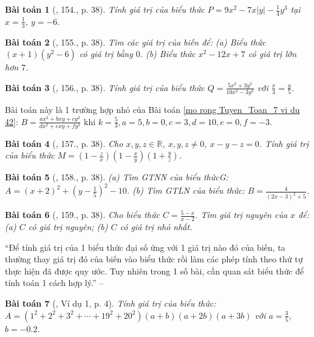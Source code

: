 \documentclass{article}
\newtheorem{baitoan}{Bài toán}
\begin{document}
\begin{baitoan}[\cite{Tuyen_Toan_7}, 154., p. 38]
	Tính giá trị của biểu thức $P = 9x^2 - 7x|y| - \frac{1}{4}y^3$ tại $x = \frac{1}{3}$, $y = -6$.
\end{baitoan}

\begin{baitoan}[\cite{Tuyen_Toan_7}, 155., p. 38]
	Tìm các giá trị của biến để: (a) Biểu thức $(x + 1)(y^2 - 6)$ có giá trị bằng $0$. (b) Biểu thức $x^2 - 12x + 7$ có giá trị lớn hơn $7$.
\end{baitoan}

\begin{baitoan}[\cite{Tuyen_Toan_7}, 156., p. 38]
	Tính giá trị của biểu thức $Q = \frac{5x^2 + 3y^2}{10x^2 - 3y^2}$ với $\frac{x}{3} = \frac{y}{5}$.
\end{baitoan}
Bài toán này là 1 trường hợp nhỏ của Bài toán \ref{mo rong Tuyen_Toan_7 vi du 42}: $B = \frac{ax^2 + bxy + cy^2}{dx^2 + exy + fy^2}$ khi $k = \frac{5}{3}, a = 5, b = 0, c = 3, d = 10, e = 0, f = -3$.

\begin{baitoan}[\cite{Tuyen_Toan_7}, 157., p. 38]
	Cho $x,y,z\in\mathbb{R}$, $x,y,z\ne0$, $x - y - z = 0$. Tính giá trị của biểu thức $M = \left(1 - \frac{z}{x}\right)\left(1 - \frac{x}{y}\right)\left(1 + \frac{y}{z}\right)$.
\end{baitoan}

\begin{baitoan}[\cite{Tuyen_Toan_7}, 158., p. 38]
	(a) Tìm GTNN của biểu thứcG: $A = (x + 2)^2 + \left(y - \frac{1}{5}\right)^2 - 10$. (b) Tìm GTLN của biểu thức: $B = \frac{4}{(2x - 3)^2 + 5}$.
\end{baitoan}

\begin{baitoan}[\cite{Tuyen_Toan_7}, 159., p. 38]
	Cho biểu thức $C = \frac{5 - x}{x - 2}$. Tìm giá trị nguyên của $x$ để: (a) $C$ có giá trị nguyên; (b) $C$ có giá trị nhỏ nhất.
\end{baitoan}
``Để tính giá trị của 1 biểu thức đại số ứng với 1 giá trị nào đó của biến, ta thường thay giá trị đó của biến vào biểu thức rồi làm các phép tính theo thứ tự thực hiện đã được quy ước. Tuy nhiên trong 1 số bài, cần quan sát biểu thức để tính toán 1 cách hợp lý.'' -- \cite[p. 4]{Binh_Toan_7_tap_2}

\begin{baitoan}[\cite{Binh_Toan_7_tap_2}, Ví dụ 1, p. 4]
	Tính giá trị của biểu thức: $A = (1^2 + 2^2 + 3^2 + \cdots + 19^2 + 20^2)(a + b)(a + 2b)(a + 3b)$ với $a = \frac{3}{5}$, $b = -0.2$.
\end{baitoan}
\end{document}
